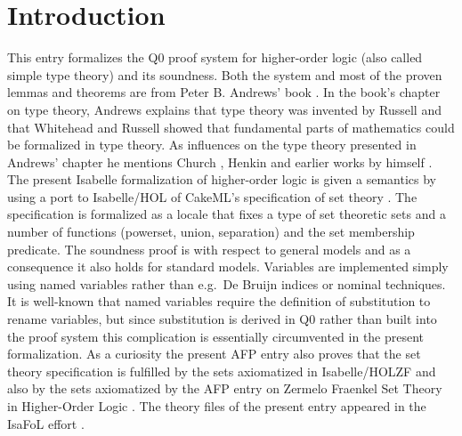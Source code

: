 \documentclass[10pt,a4paper]{article}
\begin{document}
\section{Introduction}
This entry formalizes the Q0 proof system for higher-order logic (also called simple type theory)
and its soundness.
Both the system and most of the proven lemmas and
theorems are from Peter B. Andrews' book \cite{andrews2013introduction}.
In the book's chapter on type theory, Andrews explains that type theory was invented by
Russell \cite{russell1908mathematical} and that Whitehead and Russell \cite{whiteheadrussel} showed that fundamental
parts of mathematics could be formalized in type theory.
As influences on the type theory presented in Andrews' chapter he mentions Church \cite{church1940formulation}, Henkin \cite{henkin1950completeness,henkin1963b} and earlier works by himself \cite{andrews1963reduction,andrews1972general}.
The present Isabelle formalization of higher-order logic is given a semantics by using a port to Isabelle/HOL of 
CakeML's specification of set theory \cite{DBLP:journals/jar/KumarAMO16}.
The specification is formalized as a locale that fixes a type of set theoretic sets
and a number of functions (powerset, union, separation) and the set membership predicate.
The soundness proof is with respect to general models and as a consequence it also holds for standard models.
Variables are implemented simply using named variables rather than e.g.\ De Bruijn indices or nominal techniques.
It is well-known that named variables require the definition of substitution to rename variables, but since
substitution is derived in Q0 rather than built into the proof system this complication is essentially
circumvented in the present formalization. 
As a curiosity the present AFP entry also proves that the set theory specification is fulfilled
by the sets axiomatized in Isabelle/HOLZF \cite{DBLP:conf/ictac/Obua06} and also by the sets axiomatized by the
AFP entry on Zermelo Fraenkel Set Theory in Higher-Order Logic \cite{ZFC_in_HOL-AFP}.
The theory files of the present entry appeared in the IsaFoL effort \cite{Q0IsaFoL}.
\end{document}
